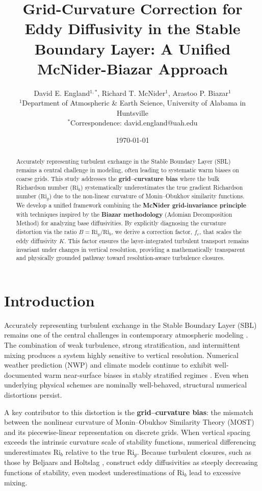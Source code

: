 \documentclass[12pt, a4paper]{article}
\title{Grid-Curvature Correction for Eddy Diffusivity in the Stable Boundary Layer: A Unified McNider-Biazar Approach}
\author{
David E. England$^{1,*}$, Richard T. McNider$^{1}$, Arastoo P. Biazar$^{1}$ \\
{\small $^{1}$Department of Atmospheric \& Earth Science, University of Alabama in Huntsville} \\
{\small $^{*}$Correspondence: david.england@uah.edu}
}
\date{\today}
\newcommand{\Rig}{\text{Ri}_g}
\newcommand{\Rib}{\text{Ri}_b}
\begin{document}
\maketitle

\begin{abstract}
Accurately representing turbulent exchange in the Stable Boundary Layer (SBL) remains a central challenge in modeling, often leading to systematic warm biases on coarse grids. This study addresses the \textbf{grid--curvature bias} where the bulk Richardson number ($\Rib$) systematically underestimates the true gradient Richardson number ($\Rig$) due to the non-linear curvature of Monin--Obukhov similarity functions. We develop a unified framework combining the \textbf{McNider grid-invariance principle} with techniques inspired by the \textbf{Biazar methodology} (Adomian Decomposition Method) for analyzing base diffusivities. By explicitly diagnosing the curvature distortion via the ratio $B = \Rig / \Rib$, we derive a correction factor, $f_c$, that scales the eddy diffusivity $K$. This factor ensures the layer-integrated turbulent transport remains invariant under changes in vertical resolution, providing a mathematically transparent and physically grounded pathway toward resolution-aware turbulence closures.
\end{abstract}

\section{Introduction}
Accurately representing turbulent exchange in the Stable Boundary Layer (SBL) remains one of the central challenges in contemporary atmospheric modeling \cite{Mahrt2014, Holtslag2013}. The combination of weak turbulence, strong stratification, and intermittent mixing produces a system highly sensitive to vertical resolution. Numerical weather prediction (NWP) and climate models continue to exhibit well-documented warm near-surface biases in stably stratified regimes \cite{Davy2014, Tjernstrom2005}. Even when underlying physical schemes are nominally well-behaved, structural numerical distortions persist.

A key contributor to this distortion is the \textbf{grid--curvature bias}: the mismatch between the nonlinear curvature of Monin--Obukhov Similarity Theory (MOST) \cite{Monin1954, Businger1971} and its piecewise-linear representation on discrete grids. When vertical spacing exceeds the intrinsic curvature scale of stability functions, numerical differencing underestimates $\Rib$ relative to the true $\Rig$. Because turbulent closures, such as those by Beljaars and Holtslag \cite{Beljaars1991}, construct eddy diffusivities as steeply decreasing functions of stability, even modest underestimations of $\Rib$ lead to excessive mixing.
\end{document}
